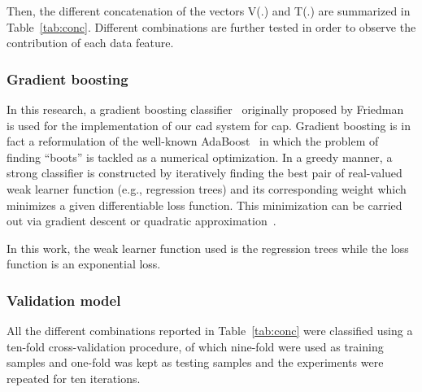 Then, the different concatenation of the vectors V(.) and T(.) are summarized in Table~\ref{tab:conc}. Different combinations are further tested in order to observe the contribution of each data feature.

\subsubsection{Gradient boosting}\label{subsubsec:gradboost}

In this research, a gradient boosting classifier~\cite{Becker2013} originally proposed by Friedman~\cite{Friedman1999,Friedman2000} is used for the implementation of our \ac{cad} system for \ac{cap}. Gradient boosting is in fact a reformulation of the well-known AdaBoost~\cite{Freund1997} in which the problem of finding ``boots'' is tackled as a numerical optimization. In a greedy manner, a strong classifier is constructed by iteratively finding the best pair of real-valued weak learner function (e.g., regression trees) and its corresponding weight which minimizes a given differentiable loss function. This minimization can be carried out via gradient descent or quadratic approximation~\cite{Zheng2008}.

In this work, the weak learner function used is the regression trees while the loss function is an exponential loss.

\subsubsection{Validation model}\label{subsubsec:valmod}

All the different combinations reported in Table~\ref{tab:conc} were classified using a ten-fold cross-validation procedure, of which nine-fold were used as training samples and one-fold was kept as testing samples and the experiments were repeated for ten iterations. 

